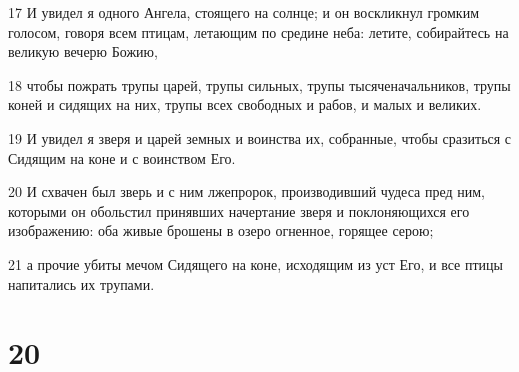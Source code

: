 \par 17 И увидел я одного Ангела, стоящего на солнце; и он воскликнул громким голосом, говоря всем птицам, летающим по средине неба: летите, собирайтесь на великую вечерю Божию,
\par 18 чтобы пожрать трупы царей, трупы сильных, трупы тысяченачальников, трупы коней и сидящих на них, трупы всех свободных и рабов, и малых и великих.
\par 19 И увидел я зверя и царей земных и воинства их, собранные, чтобы сразиться с Сидящим на коне и с воинством Его.
\par 20 И схвачен был зверь и с ним лжепророк, производивший чудеса пред ним, которыми он обольстил принявших начертание зверя и поклоняющихся его изображению: оба живые брошены в озеро огненное, горящее серою;
\par 21 а прочие убиты мечом Сидящего на коне, исходящим из уст Его, и все птицы напитались их трупами.

\chapter{20}

